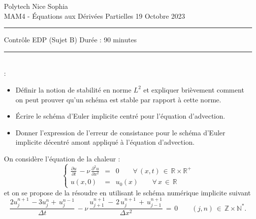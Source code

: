 \documentclass[12pt,a4paper]{article}
\begin{document}
 \hfill Polytech Nice Sophia\\
\noindent MAM4 - \'Equations aux D\'eriv\'ees Partielles \hfill 
19 Octobre 2023 \\

\hrule

\vspace{0.8cm}
\centerline {\large \sc Contrôle EDP (Sujet B) Dur\'ee : 90 minutes}
\vspace{0.8cm}


\hrule
\vspace{0.5cm}
\\

:
\begin{itemize}
\item Définir la notion de stabilité en norme $L^{2}$ et expliquer brièvement comment on peut prouver qu'un schéma est stable par rapport à cette norme.
\item Écrire le schéma d'Euler implicite centré pour l'équation d'advection. 
\item Donner l'expression de l'erreur de consistance pour le schéma d'Euler implicite décentré amont appliqué à l'équation d'advection.
\end{itemize}

\vspace{0.5 cm}



\noindent On consid\`ere l'\'equation de la chaleur :
\begin{equation} \label{eqn:chaleur}
\left\{
\begin{array}{rcl}
\displaystyle \frac{\partial u}{\partial t} \, - \nu\, \frac{\partial^2 u}{\partial x^2}  & =  & 0  \qquad \forall \, (x,t) \, \in \, \mathbb{R} \times \mathbb{R}^+ \\
\displaystyle u(x,0)  & =  & u_0(x)  \qquad \forall \, x \, \in \, \mathbb{R}
\end{array}
\right.
\end{equation}
et on se propose de la r\'esoudre en utilisant le sch\'ema num\'erique implicite suivant
\begin{equation} \label{eqn:schema2}
\displaystyle  \frac{2u_j^{n+1} \, - 3u_j^n + \, u_j^{n-1}}{\Delta t} \, - \nu\,  \frac{u_{j+1}^{n+1} \,- \,  2 \, u_j^{n+1} \, + \, u_{j-1}^{n+1}}{\Delta x ^2 } \,  =  \,   0 \qquad (j,n) \, \in \, \mathbb{Z} \times \mathbb{N}^* .
\end{equation}
\end{document}
